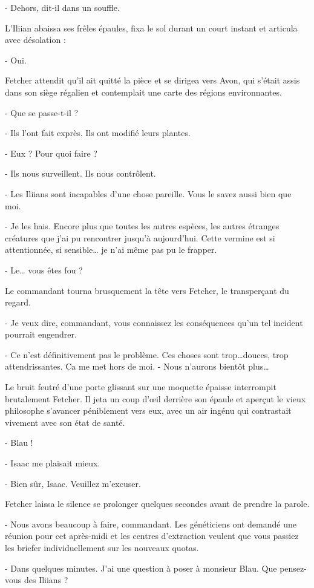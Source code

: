 \documentclass[12pt]{book}
\begin{document}
-  Dehors, dit-il dans un souffle.


L’Iliian abaissa ses frêles épaules, fixa le sol durant un court instant et articula avec désolation :


-  Oui.

Fetcher attendit qu’il ait quitté la pièce et se dirigea vers Avon, qui s'était assis dans son siège régalien et contemplait une carte des régions environnantes.


- Que se passe-t-il ?

-  Ils l’ont fait exprès. Ils ont modifié leurs plantes.

-  Eux ? Pour quoi faire ?

- Ils nous surveillent. Ils nous contrôlent.

- Les Iliians sont incapables d’une chose pareille. Vous le savez aussi bien que moi.

- Je les hais. Encore plus que toutes les autres espèces, les autres étranges créatures que j’ai pu rencontrer jusqu’à aujourd’hui. Cette vermine est si attentionnée, si sensible… je n’ai même pas pu le frapper.

-  Le… vous êtes fou ?

Le commandant tourna brusquement la tête vers Fetcher, le transperçant du regard.


- Je veux dire, commandant, vous connaissez les conséquences qu’un tel incident pourrait engendrer.

 -  Ce n’est définitivement pas le problème. Ces choses sont trop…douces, trop attendrissantes. Ca me met hors de moi.
- Nous n’aurons bientôt plus…

Le bruit feutré d’une porte glissant sur une moquette épaisse interrompit brutalement Fetcher. Il jeta un coup d’œil derrière son épaule et aperçut le vieux philosophe s’avancer péniblement vers eux, avec un air ingénu qui contrastait vivement avec son état de santé.


-  Blau !

- Isaac me plaisait mieux.

-  Bien sûr, Isaac. Veuillez m’excuser.

 Fetcher laissa le silence se prolonger quelques secondes avant de prendre la parole.


- Nous avons beaucoup à faire, commandant. Les généticiens ont demandé une réunion pour cet après-midi et les centres d’extraction veulent que vous passiez les briefer individuellement sur les nouveaux quotas.

- Dans quelques minutes. J’ai une question à poser à monsieur Blau. Que pensez-vous des Iliians ?
\end{document}
